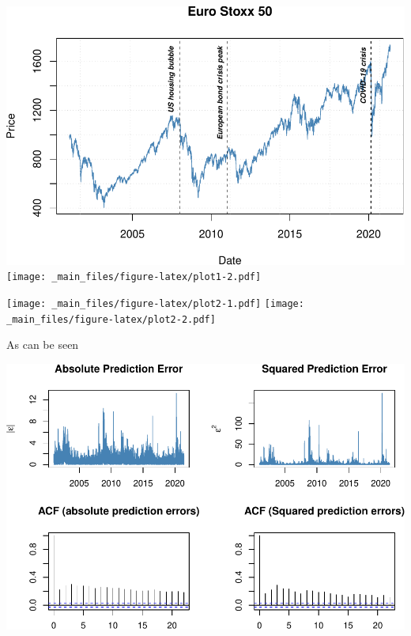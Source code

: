 \documentclass[a4paper, twoside]{templates/ociamthesis}
\begin{document}
\includegraphics{_main_files/figure-latex/plot1-1.pdf} \texttt{[image: \_main\_files/figure-latex/plot1-2.pdf]}

\texttt{[image: \_main\_files/figure-latex/plot2-1.pdf]} \texttt{[image: \_main\_files/figure-latex/plot2-2.pdf]}

As can be seen

\includegraphics{_main_files/figure-latex/acfplots-1.pdf}
\end{document}
